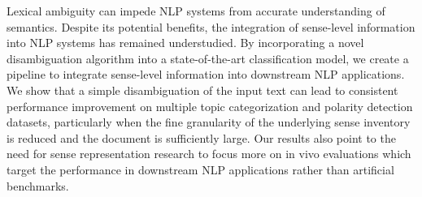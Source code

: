Lexical ambiguity can impede NLP systems from accurate understanding of semantics. Despite its potential benefits, the integration of sense-level information into NLP systems has remained understudied. By incorporating a novel disambiguation algorithm into a state-of-the-art classification model, we create a pipeline to integrate sense-level information into downstream NLP applications. We show that a simple disambiguation of the input text can lead to consistent performance improvement on multiple topic categorization and polarity detection datasets, particularly when the fine granularity of the underlying sense inventory is reduced and the document is sufficiently large. Our results also point to the need for sense representation research to focus more on in vivo evaluations which target the performance in downstream NLP applications rather than artificial benchmarks.
